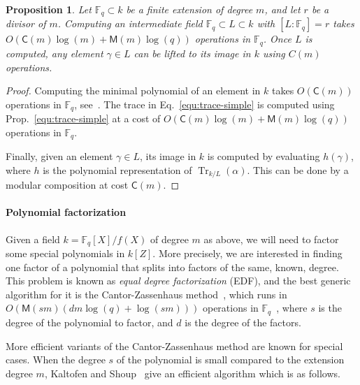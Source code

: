\documentclass[12pt]{article}
\theoremstyle{plain}
\newtheorem{proposition}[theorem]{Proposition}
\theoremstyle{definition}
\DeclareMathOperator{\trace}{Tr} %
\def\F{\ensuremath{\mathbb{F}}}
\def\MM{\ensuremath{\mathsf{M}}}
\def\CC{\ensuremath{\mathsf{C}}}
\newcounter{algorithm}
\begin{document}
\begin{proposition}
	\label{prop:subfield}
	Let $\F_q \subset k$ be a finite extension of degree $m$, and
        let $r$ be a divisor of $m$.  Computing an intermediate field
        $\F_q \subset L \subset k$ with $[L:\F_q]=r$ takes
        $O(\CC(m)\log(m) + \MM(m)\log(q))$ operations in $\F_q$.  Once
        $L$ is computed, any element $\gamma\in L$ can be lifted to
        its image in $k$ using $C(m)$ operations.
\end{proposition}
\begin{proof}
	Computing the minimal polynomial of an element in $k$ takes $O(\CC(m))$ operations in $\F_q$, 
	see~\cite{shoup93}. %
        The trace in Eq.~\eqref{equ:trace-simple} is computed using Prop.~\ref{equ:trace-simple}
        at a cost of $O(\CC(m)\log(m)+\MM(m)\log(q))$ operations in $\F_q$.

        Finally, given an element $\gamma\in L$, its image in $k$ is
        computed by evaluating $h(\gamma)$, where $h$ is the
        polynomial representation of $\trace_{k/L}(\alpha)$. This can
        be done by a modular composition at cost $\CC(m)$.
\end{proof}


\paragraph{Polynomial factorization}
Given a field $k = \F_q[X]/f(X)$ of degree $m$ as above, we will need to
factor some special polynomials in $k[Z]$. More precisely, we are
interested in finding one factor of a polynomial that splits into
factors of the same, known, degree. This problem is known as
\emph{equal degree factorization} (EDF), and the best generic algorithm for
it is the Cantor-Zassenhaus method~\cite{cantor1981,von1992computing},
which runs in $O(\MM(sm)(dm\log(q) + \log(sm)))$ operations in
$\F_q$~\cite[Th.~14.9]{vzGG}, where $s$ is the degree of the
polynomial to factor, and $d$ is the degree of the factors.

More efficient variants of the Cantor-Zassenhaus method are known for
special cases. When the degree $s$ of the polynomial is small compared
to the extension degree $m$, Kaltofen and Shoup~\cite{kaltofen+shoup97} 
give an efficient algorithm which is as follows.
\end{document}
